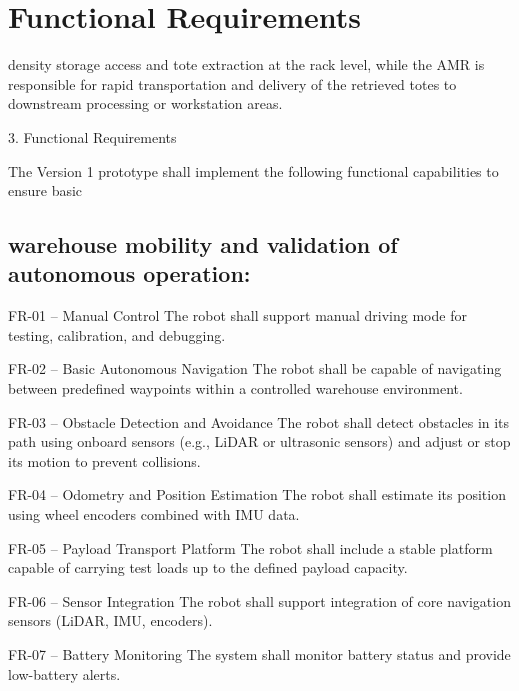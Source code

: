 \chapter{Functional Requirements}

density storage access and tote extraction at the rack level, while the AMR is responsible for rapid transportation and delivery of the retrieved totes to downstream processing or workstation areas.

3. Functional Requirements

The Version 1 prototype shall implement the following functional capabilities to ensure basic

\section*{warehouse mobility and validation of autonomous operation:}

FR-01 -- Manual Control The robot shall support manual driving mode for testing, calibration, and debugging.

FR-02 -- Basic Autonomous Navigation The robot shall be capable of navigating between predefined waypoints within a controlled warehouse environment.

FR-03 -- Obstacle Detection and Avoidance The robot shall detect obstacles in its path using onboard sensors (e.g., LiDAR or ultrasonic sensors) and adjust or stop its motion to prevent collisions.

FR-04 -- Odometry and Position Estimation The robot shall estimate its position using wheel encoders combined with IMU data.

FR-05 -- Payload Transport Platform The robot shall include a stable platform capable of carrying test loads up to the defined payload capacity.

FR-06 -- Sensor Integration The robot shall support integration of core navigation sensors (LiDAR, IMU, encoders).

FR-07 -- Battery Monitoring The system shall monitor battery status and provide low-battery alerts.

